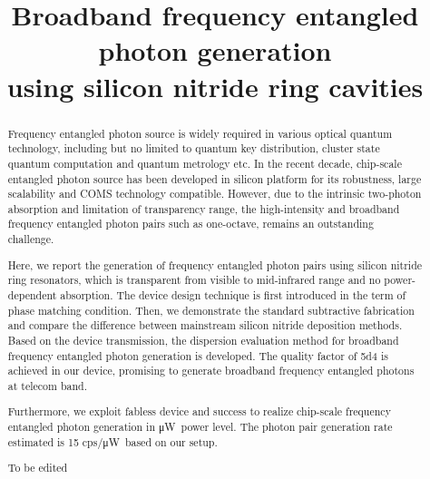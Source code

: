\documentclass[final]{kuee_en}
\title{Broadband frequency entangled photon generation \\using silicon nitride ring cavities}
\author{\cjk{殷　政浩}}
\date{\cjk{令和2年1月31日}}
\newcommand{\uW}{\si{\micro\watt}~}
\newcommand{\tbe}{\color{red} To be edited}
\begin{document}
\maketitle

\begin{abstract}
Frequency entangled photon source is widely required in various optical quantum technology, including but no limited to quantum key distribution, cluster state quantum computation and quantum metrology etc. In the recent decade, chip-scale entangled photon source has been developed in silicon platform for its robustness, large scalability and COMS technology compatible. However, due to the intrinsic two-photon absorption and limitation of transparency range, the high-intensity and broadband frequency entangled photon pairs such as one-octave, remains an outstanding challenge.

Here, we report the generation of frequency entangled photon pairs using silicon nitride ring resonators, which is transparent from visible to mid-infrared range and no power-dependent absorption.
The device design technique is first introduced in the term of phase matching condition. 
Then, we demonstrate the standard subtractive fabrication and compare the difference between mainstream silicon nitride deposition methods. 
Based on the device transmission, the dispersion evaluation method for broadband frequency entangled photon generation is developed.
The quality factor of \num{5d4} is achieved in our device, promising to generate broadband frequency entangled photons at telecom band. 

Furthermore, we exploit fabless device and success to realize chip-scale frequency entangled photon generation in \uW power level. The photon pair generation rate estimated is 15 cps/\uW based on our setup.

\tbe


\end{abstract}

\tableofcontents












\begin{acknowledgements}
\lipsum[2-4]
\end{acknowledgements}


\printbibliography[title=References,heading=bibintoc]

\clearpage %
\processdelayedfloats
\clearpage

\end{document}

